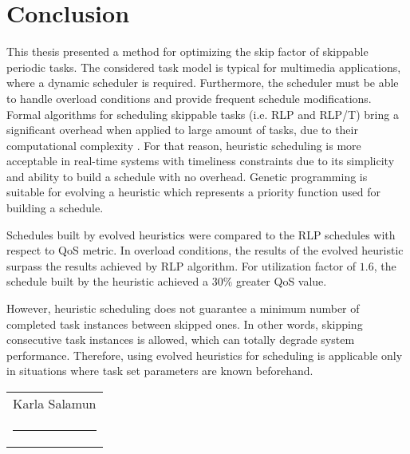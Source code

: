 \chapter*{Conclusion}
This thesis presented a method for optimizing the skip factor of skippable periodic tasks.
The considered task model is typical for multimedia applications, where a dynamic scheduler is required.
Furthermore, the scheduler must be able to handle overload conditions and provide frequent schedule modifications.
Formal algorithms for scheduling skippable tasks (i.e. RLP and RLP/T) bring a significant overhead when applied to large amount of tasks, due to their computational complexity \cite{onqos}.
For that reason, heuristic scheduling is more acceptable in real-time systems with timeliness constraints due to its simplicity and ability to build a schedule with no overhead.
Genetic programming is suitable for evolving a heuristic which represents a priority function used for building a schedule.

Schedules built by evolved heuristics were compared to the RLP schedules with respect to QoS metric.
In overload conditions, the results of the evolved heuristic surpass the results achieved by RLP algorithm.
For utilization factor of $1.6$, the schedule built by the heuristic achieved a $30\%$ greater QoS value.

However, heuristic scheduling does not guarantee a minimum number of completed task instances between skipped ones.
In other words, skipping consecutive task instances is allowed, which can totally degrade system performance.
Therefore, using evolved heuristics for scheduling is applicable only in situations where task set parameters are known beforehand.

\newcommand{\namesigdate}[2][5cm]{%
  \begin{tabular}{@{}p{#1}@{}}
    #2 \\[2\normalbaselineskip] \hrule \\[15pt]
  \end{tabular}}

\vspace*{\fill} \noindent \hfill \namesigdate{Karla Salamun}